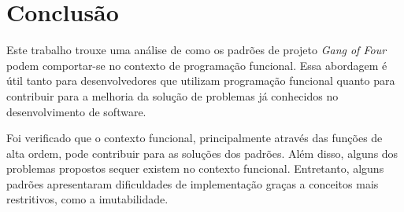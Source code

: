\chapter{Conclusão}


Este trabalho trouxe uma análise de como os 
padrões de projeto \textit{Gang of Four} 
podem comportar-se no contexto de programação 
funcional. Essa abordagem é útil tanto 
para desenvolvedores que utilizam programação 
funcional quanto para contribuir para a 
melhoria da solução de problemas já 
conhecidos no desenvolvimento de software.




Foi verificado que o contexto funcional, 
principalmente através das funções de alta 
ordem, pode contribuir para as soluções dos 
padrões. Além disso, alguns dos problemas 
propostos sequer existem no contexto funcional. 
Entretanto, alguns padrões apresentaram 
dificuldades de implementação graças a 
conceitos mais restritivos, como a 
imutabilidade.






